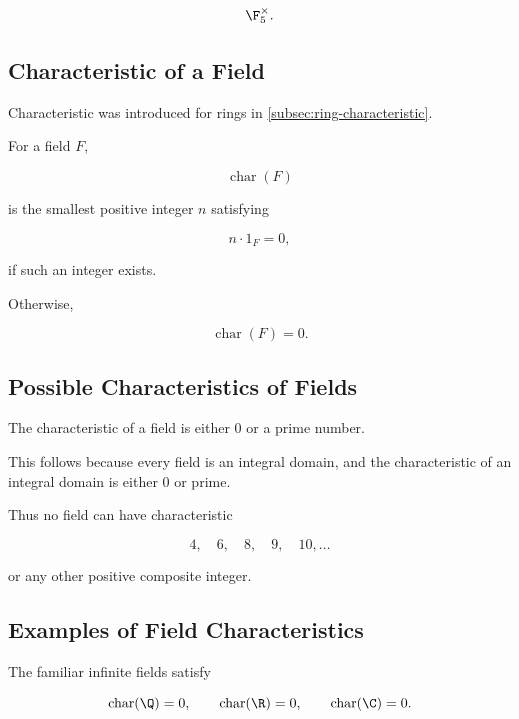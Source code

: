 \[ \F_5^\times. \]

\subsection{Characteristic of a Field}
\label{subsec:field-characteristic}

Characteristic was introduced for rings in
\cref{subsec:ring-characteristic}.

For a field \(F\),

\[ \operatorname{char}(F) \]

is the smallest positive integer \(n\) satisfying

\[ n\cdot1_F=0, \]

if such an integer exists.

Otherwise,

\[ \operatorname{char}(F)=0. \]

\subsection{Possible Characteristics of Fields}
\label{subsec:field-characteristic-prime}

\begin{theorem}
The characteristic of a field is either \(0\) or a prime number.
\end{theorem}

This follows because every field is an integral domain, and the
characteristic of an integral domain is either \(0\) or prime.

Thus no field can have characteristic

\[ 4,\quad6,\quad8,\quad9,\quad10,\ldots \]

or any other positive composite integer.

\subsection{Examples of Field Characteristics}
\label{subsec:field-characteristic-examples}

The familiar infinite fields satisfy

\[ \operatorname{char}(\Q)=0,\qquad \operatorname{char}(\R)=0,\qquad \operatorname{char}(\C)=0. \]

